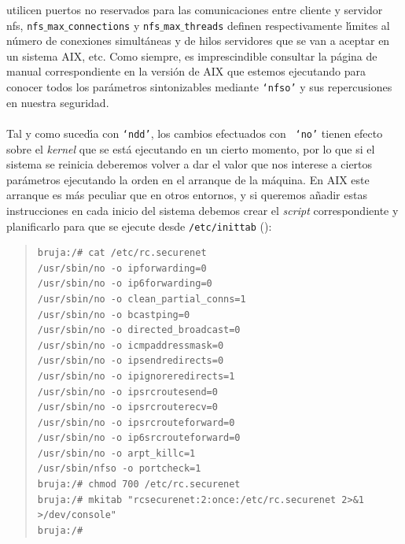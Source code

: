 utilicen puertos no reservados para las comunicaciones entre cliente y servidor
{\sc nfs}, {\tt nfs$\_$max$\_$connections} y {\tt nfs$\_$max$\_$threads} definen
respectivamente l\'{\i}mites al n\'umero de conexiones simult\'aneas y de hilos 
servidores que se van a aceptar en un sistema AIX, etc. Como siempre, es 
imprescindible consultar la p\'agina de manual correspondiente en la versi\'on
de AIX que estemos ejecutando para conocer todos los par\'ametros sintonizables
mediante {\tt `nfso'} y sus repercusiones en nuestra seguridad.\\
\\Tal y como suced\'{\i}a con {\tt `ndd'}, los cambios efectuados con {\tt 
`no'} tienen efecto sobre el {\it kernel} que se est\'a ejecutando en un cierto 
momento, por lo que si el sistema se reinicia deberemos volver a dar el valor 
que nos interese a ciertos par\'ametros ejecutando la orden en el arranque de 
la m\'aquina. En AIX este arranque es m\'as peculiar que en otros entornos, y
si queremos a\~nadir estas instrucciones en cada inicio del sistema debemos 
crear el {\it script} correspondiente y planificarlo para que se ejecute desde 
{\tt /etc/inittab} (\cite{kn:bha01}):
\begin{quote}
\begin{verbatim}
bruja:/# cat /etc/rc.securenet
/usr/sbin/no -o ipforwarding=0
/usr/sbin/no -o ip6forwarding=0
/usr/sbin/no -o clean_partial_conns=1
/usr/sbin/no -o bcastping=0
/usr/sbin/no -o directed_broadcast=0
/usr/sbin/no -o icmpaddressmask=0
/usr/sbin/no -o ipsendredirects=0
/usr/sbin/no -o ipignoreredirects=1
/usr/sbin/no -o ipsrcroutesend=0
/usr/sbin/no -o ipsrcrouterecv=0
/usr/sbin/no -o ipsrcrouteforward=0
/usr/sbin/no -o ip6srcrouteforward=0
/usr/sbin/no -o arpt_killc=1
/usr/sbin/nfso -o portcheck=1
bruja:/# chmod 700 /etc/rc.securenet
bruja:/# mkitab "rcsecurenet:2:once:/etc/rc.securenet 2>&1 >/dev/console"
bruja:/#
\end{verbatim}
\end{quote}

